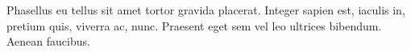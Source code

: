 {\ttfamily\raggedright
Phasellus eu tellus sit amet tortor gravida placerat. Integer sapien est,
iaculis in, pretium quis, viverra ac, nunc. Praesent eget sem vel leo ultrices
bibendum. Aenean faucibus.}
